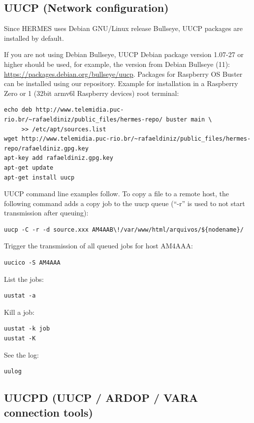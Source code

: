 \documentclass[11pt,a4paper]{article}
\begin{document}
\subsection{UUCP (Network configuration)}

Since HERMES uses Debian GNU/Linux release Bullseye, UUCP packages are installed by default.

If you are not using Debian Bullseye, UUCP Debian package version 1.07-27 or higher should be used, for example,
the version from Debian Bullseye (11):
\url{https://packages.debian.org/bullseye/uucp}. Packages for Raspberry OS
Buster can be installed using our repository. Example for installation in a
Raspberry Zero or 1 (32bit armv6l Raspberry devices) root terminal:

\begin{verbatim}
echo deb http://www.telemidia.puc-rio.br/~rafaeldiniz/public_files/hermes-repo/ buster main \
     >> /etc/apt/sources.list
wget http://www.telemidia.puc-rio.br/~rafaeldiniz/public_files/hermes-repo/rafaeldiniz.gpg.key
apt-key add rafaeldiniz.gpg.key
apt-get update
apt-get install uucp
\end{verbatim}



UUCP command line examples follow. To copy a file to a remote host,
the following command adds a copy job to the uucp queue (``-r'' is used to
not start transmission after queuing):
\begin{verbatim}
uucp -C -r -d source.xxx AM4AAB\!/var/www/html/arquivos/${nodename}/
\end{verbatim}

Trigger the transmission of all queued jobs for host
AM4AAA:
\begin{verbatim}
uucico -S AM4AAA
\end{verbatim}

List the jobs:
\begin{verbatim}
uustat -a
\end{verbatim}

Kill a job:
\begin{verbatim}
uustat -k job
uustat -K
\end{verbatim}

See the log:
\begin{verbatim}
uulog
\end{verbatim}


\subsection{UUCPD (UUCP / ARDOP / VARA connection tools)}
\end{document}
